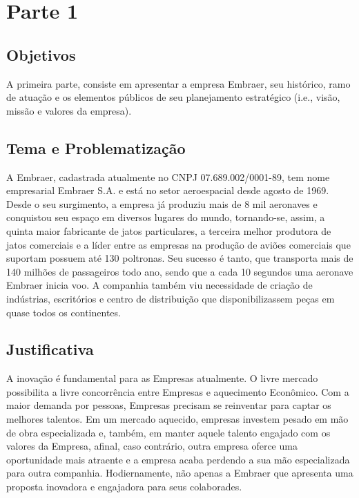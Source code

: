 
\chapter{Parte 1}

\section{Objetivos}
A primeira parte, consiste em apresentar a empresa Embraer, seu histórico,
ramo de atuação e os elementos públicos de seu planejamento estratégico (i.e., visão, missão e
valores da empresa). 

\section{Tema e Problematização}
A Embraer, cadastrada atualmente no CNPJ 07.689.002/0001-89, tem nome empresarial Embraer S.A. e está no setor aeroespacial desde agosto de 1969. Desde o seu surgimento, a empresa já produziu mais de 8 mil aeronaves e conquistou seu espaço em diversos lugares do mundo, tornando-se, assim, a quinta maior fabricante de jatos particulares, a terceira melhor produtora de jatos comerciais e a líder entre as empresas na produção de aviões comerciais que suportam possuem até 130 poltronas. Seu sucesso é tanto, que transporta mais de 140 milhões de passageiros todo ano, sendo que a cada 10 segundos uma aeronave Embraer inicia voo. A companhia também viu necessidade de criação de indústrias, escritórios e centro de distribuição que disponibilizassem peças em quase todos os continentes.



\section{Justificativa}
A inovação é fundamental para as Empresas atualmente. O livre mercado possibilita a livre concorrência entre Empresas e aquecimento Econômico. Com a maior demanda por pessoas, Empresas precisam se reinventar para captar os melhores talentos. 
Em um mercado aquecido, empresas investem pesado em mão de obra especializada e, também, em manter aquele talento engajado com os valores da Empresa, afinal, caso contrário, outra empresa oferce uma oportunidade mais atraente e a empresa acaba perdendo a sua mão especializada para outra companhia. Hodiernamente, não apenas a Embraer que apresenta uma proposta inovadora e engajadora para seus colaborades.






